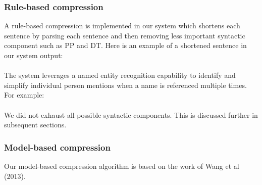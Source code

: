 \documentclass[11pt]{article}
\begin{document}
\subsubsection{Rule-based compression}
A rule-based compression is implemented in our system which shortens each sentence by parsing each sentence and then removing less important syntactic component such as PP and DT. Here is an example of a shortened sentence in our system output:
\\
\\

The system leverages a named entity recognition capability to identify and simplify individual person mentions when a name is referenced multiple times. For example:
\\

\\

We did not exhaust all possible syntactic components. This is discussed further in subsequent sections.

\subsubsection{Model-based compression}

Our model-based compression algorithm is based on the work of Wang et al (2013).
\end{document}
